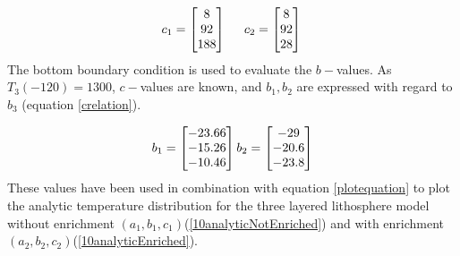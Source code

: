 \documentclass[10pt,a4paper]{article}
\begin{document}
\begin{equation}
c_1=\begin{bmatrix}
8\\
92\\
188\\
\end{bmatrix}\\
\hspace{0.5cm}
c_2=\begin{bmatrix}
8\\
92\\
28\\
\end{bmatrix}\\
\vspace{0.5cm}
\end{equation}
The bottom boundary condition is used to evaluate the $b-$values. As $T_3(-120)=1300$, $c-$values are known, and $b_1,b_2$ are expressed with regard to $b_3$ (equation \ref{crelation}).

\begin{equation}
b_1=\begin{bmatrix}
-23.66\\
-15.26\\
-10.46\\
\end{bmatrix}\\
\vspace{0.5cm}
b_2=\begin{bmatrix}
-29\\
-20.6\\
-23.8\\
\end{bmatrix}
\end{equation}
These values have been used in combination with equation \ref{plotequation} to plot the analytic temperature distribution for the three layered lithosphere model without enrichment $(a_1,b_1,c_1)$(\ref{10analyticNotEnriched}) and with enrichment $(a_2,b_2,c_2)$(\ref{10analyticEnriched}). 
\end{document}
